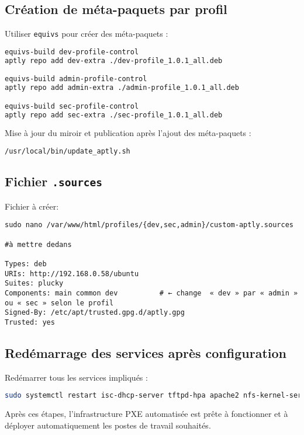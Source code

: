 \documentclass[a4paper,12pt]{article}
\begin{document}
\subsection{Création de méta-paquets par profil}

Utiliser \texttt{equivs} pour créer des méta-paquets :

\begin{lstlisting}[language=bash]
equivs-build dev-profile-control
aptly repo add dev-extra ./dev-profile_1.0.1_all.deb

equivs-build admin-profile-control
aptly repo add admin-extra ./admin-profile_1.0.1_all.deb

equivs-build sec-profile-control
aptly repo add sec-extra ./sec-profile_1.0.1_all.deb
\end{lstlisting}

Mise à jour du miroir et publication après l'ajout des méta-paquets :

\begin{lstlisting}[language=bash]
/usr/local/bin/update_aptly.sh
\end{lstlisting}

\subsection{Fichier \texttt{.sources}}
Fichier à créer:
\begin{lstlisting}
sudo nano /var/www/html/profiles/{dev,sec,admin}/custom-aptly.sources

#à mettre dedans

Types: deb
URIs: http://192.168.0.58/ubuntu
Suites: plucky
Components: main common dev          # ← change  « dev » par « admin » ou « sec » selon le profil
Signed-By: /etc/apt/trusted.gpg.d/aptly.gpg
Trusted: yes
\end{lstlisting}

\subsection{Redémarrage des services après configuration}

Redémarrer tous les services impliqués :

\begin{lstlisting}[language=bash]
sudo systemctl restart isc-dhcp-server tftpd-hpa apache2 nfs-kernel-server
\end{lstlisting}

Après ces étapes, l’infrastructure PXE automatisée est prête à fonctionner et à déployer automatiquement les postes de travail souhaités.
\end{document}
